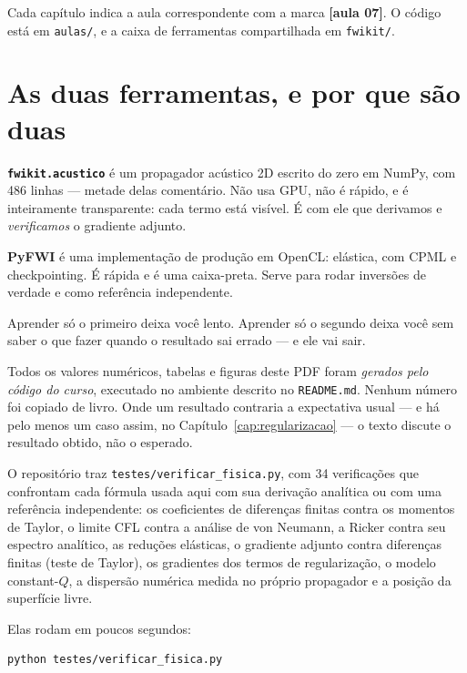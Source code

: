 \documentclass[11pt,a4paper,oneside]{report}
\newcommand{\aula}[1]{\textcolor{cianofwi}{\textbf{[aula #1]}}}
\newcommand{\arq}[1]{\texttt{\small #1}}
\begin{document}
Cada capítulo indica a aula correspondente com a marca \aula{07}. O código
está em \arq{aulas/}, e a caixa de ferramentas compartilhada em \arq{fwikit/}.

\section*{As duas ferramentas, e por que são duas}

\textbf{\arq{fwikit.acustico}} é um propagador acústico 2D escrito do zero em
NumPy, com 486 linhas --- metade delas comentário. Não usa GPU, não é rápido, e
é inteiramente transparente: cada termo está visível. É com ele que derivamos e
\emph{verificamos} o gradiente adjunto.

\textbf{PyFWI} é uma implementação de produção em OpenCL: elástica, com CPML e
checkpointing. É rápida e é uma caixa-preta. Serve para rodar inversões de
verdade e como referência independente.

Aprender só o primeiro deixa você lento. Aprender só o segundo deixa você sem
saber o que fazer quando o resultado sai errado --- e ele vai sair.

\begin{atencao}
Todos os valores numéricos, tabelas e figuras deste PDF foram \emph{gerados
pelo código do curso}, executado no ambiente descrito no
\arq{README.md}. Nenhum número foi copiado de livro. Onde um resultado
contraria a expectativa usual --- e há pelo menos um caso assim, no
Capítulo~\ref{cap:regularizacao} --- o texto discute o resultado obtido, não o esperado.
\end{atencao}

\begin{pratica}
O repositório traz \arq{testes/verificar\_fisica.py}, com 34 verificações que
confrontam cada fórmula usada aqui com sua derivação analítica ou com uma
referência independente: os coeficientes de diferenças finitas contra os
momentos de Taylor, o limite CFL contra a análise de von Neumann, a Ricker
contra seu espectro analítico, as reduções elásticas, o gradiente adjunto
contra diferenças finitas (teste de Taylor), os gradientes dos termos de
regularização, o modelo constant-$Q$, a dispersão numérica medida no próprio
propagador e a posição da superfície livre.

Elas rodam em poucos segundos:
\begin{lstlisting}[language=bash]
python testes/verificar_fisica.py
\end{lstlisting}
\end{pratica}
\end{document}
